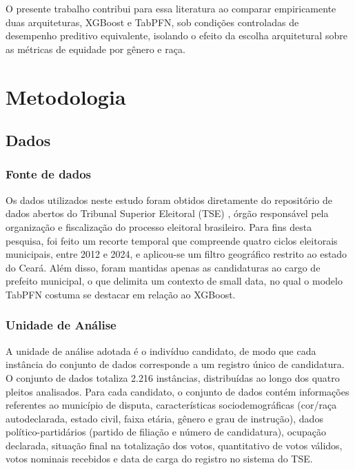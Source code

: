 \documentclass[12pt]{article}
\begin{document}
O presente trabalho contribui para essa literatura ao comparar empiricamente duas arquiteturas, XGBoost e TabPFN, sob condições controladas de desempenho preditivo equivalente, isolando o efeito da escolha arquitetural sobre as métricas de equidade por gênero e raça.

\section{Metodologia} \label{sec:metodologia}

\subsection{Dados}

\subsubsection{Fonte de dados}

Os dados utilizados neste estudo foram obtidos diretamente do repositório de dados
abertos do Tribunal Superior Eleitoral (TSE) \cite{basedosdados:2026}, órgão responsável pela organização
e fiscalização do processo eleitoral brasileiro. Para fins desta pesquisa, foi feito
um recorte temporal que compreende quatro ciclos eleitorais municipais, entre 2012 e 2024,
e aplicou-se um filtro geográfico restrito ao estado do Ceará. Além disso, foram mantidas
apenas as candidaturas ao cargo de prefeito municipal, o que delimita um contexto de small
data, no qual o modelo TabPFN costuma se destacar em relação ao XGBoost.

\subsubsection{Unidade de Análise}
A unidade de análise adotada é o indivíduo candidato, de modo que cada instância do conjunto
de dados corresponde a um registro único de candidatura. O conjunto de dados totaliza 2.216
instâncias, distribuídas ao longo dos quatro pleitos analisados. Para cada candidato, o
conjunto de dados contém informações referentes ao município de disputa, características
sociodemográficas (cor/raça autodeclarada, estado civil, faixa etária, gênero e grau de
instrução), dados político-partidários (partido de filiação e número de candidatura),
ocupação declarada, situação final na totalização dos votos, quantitativo de votos válidos,
votos nominais recebidos e data de carga do registro no sistema do TSE.
\end{document}
